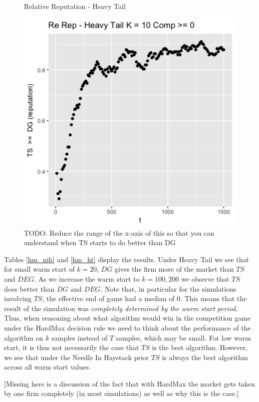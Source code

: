 \documentclass{article}
\theoremstyle{definition}
\begin{document}
\begin{figure}
\label{rel_rep_ht_fine}
\caption{Relative Reputation - Heavy Tail}
\includegraphics[scale=0.3]{figures/ts_dg_heavy_fine}
\caption*{TODO: Reduce the range of the x-axis of this so that you can understand when TS starts to do better than DG}
\end{figure}

Tables \ref{hm_nih} and \ref{hm_ht} display the results. Under Heavy Tail we see that for small warm start of $k = 20$, $DG$ gives the firm more of the market than $TS$ and $DEG$. As we increase the warm start to $k = 100, 200$ we observe that $TS$ does better than $DG$ and $DEG$. Note that, in particular for the simulations involving $TS$, the effective end of game had a median of 0. This means that the result of the simulation was \textit{completely determined by the warm start period}. Thus, when reasoning about what algorithm would win in the competition game under the HardMax decision rule we need to think about the performance of the algorithm on $k$ samples instead of $T$ samples, which may be small. For low warm start, it is thus not necessarily the case that $TS$ is the best algorithm. However, we see that under the Needle In Haystack prior $TS$ is always the best algorithm across all warm start values.

[Missing here is a discussion of the fact that with HardMax the market gets taken by one firm completely (in most simulations) as well as why this is the case.]
\end{document}
